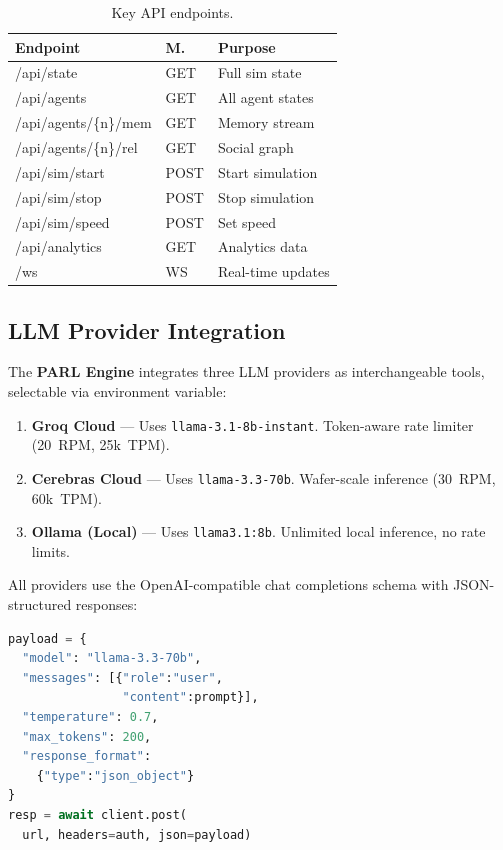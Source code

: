 \documentclass[conference]{IEEEtran}
\begin{document}
\begin{table}[ht]
\centering
\caption{Key API endpoints.}
\label{tab:api}
\scriptsize
\begin{tabular}{@{}lll@{}}
\toprule
\textbf{Endpoint} & \textbf{M.} & \textbf{Purpose} \\
\midrule
/api/state          & GET  & Full sim state \\
/api/agents         & GET  & All agent states \\
/api/agents/\{n\}/mem   & GET  & Memory stream \\
/api/agents/\{n\}/rel   & GET  & Social graph \\
/api/sim/start      & POST & Start simulation \\
/api/sim/stop       & POST & Stop simulation \\
/api/sim/speed      & POST & Set speed \\
/api/analytics      & GET  & Analytics data \\
/ws                 & WS   & Real-time updates \\
\bottomrule
\end{tabular}
\end{table}

\subsection{LLM Provider Integration}

The \textbf{PARL Engine} integrates three LLM providers as interchangeable tools, selectable via environment variable:

\begin{enumerate}
    \item \textbf{Groq Cloud} --- Uses \texttt{llama-3.1-8b-instant}. Token-aware rate limiter (20~RPM, 25k~TPM).
    \item \textbf{Cerebras Cloud} --- Uses \texttt{llama-3.3-70b}. Wafer-scale inference (30~RPM, 60k~TPM).
    \item \textbf{Ollama (Local)} --- Uses \texttt{llama3.1:8b}. Unlimited local inference, no rate limits.
\end{enumerate}

All providers use the OpenAI-compatible chat completions schema with JSON-structured responses:

\begin{lstlisting}[language=Python]
payload = {
  "model": "llama-3.3-70b",
  "messages": [{"role":"user",
                "content":prompt}],
  "temperature": 0.7,
  "max_tokens": 200,
  "response_format":
    {"type":"json_object"}
}
resp = await client.post(
  url, headers=auth, json=payload)
\end{lstlisting}
\end{document}
